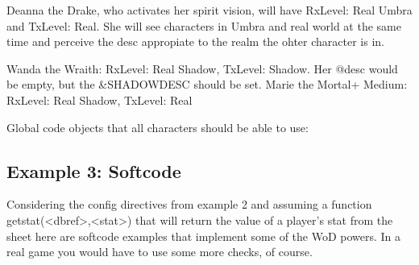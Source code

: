 \documentclass[letterpaper,10pt,english]{sphinxmanual}
\begin{document}
\sphinxAtStartPar
Deanna the Drake, who activates her spirit vision, will have
RxLevel: Real Umbra and TxLevel: Real. She will see characters in Umbra and
real world at the same time and perceive the desc appropiate to the realm
the ohter character is in.

\sphinxAtStartPar
Wanda the Wraith: RxLevel: Real Shadow, TxLevel: Shadow. Her @desc
would be empty, but the \&SHADOWDESC should be set.
Marie the Mortal+ Medium: RxLevel: Real Shadow, TxLevel: Real

\sphinxAtStartPar
Global code objects that all characters should be able to use:

\begin{sphinxVerbatim}[commandchars=\\\{\}]
   
\end{sphinxVerbatim}


\subsection{Example 3: Softcode}
\label{\detokenize{advanced:example-3-softcode}}
\sphinxAtStartPar
Considering the config directives from example 2 and assuming a function
getstat(\textless{}dbref\textgreater{},\textless{}stat\textgreater{}) that will return the value of a player’s stat from
the sheet here are softcode examples that implement some of the WoD powers.
In a real game you would have to use some more checks, of course.
\end{document}
